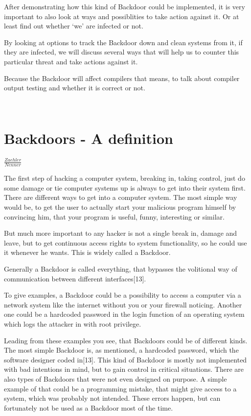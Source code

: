 \documentclass[a4paper, 12pt]{article}
\begin{document}
After demonstrating how this kind of Backdoor could be implemented, it is very important to also look at ways and possiblities to take action against it. Or at least find out whether `we' are infected or not.

By looking at options to track the Backdoor down and clean systems from it, if they are infected, we will discuss several ways that will help us to counter this particular threat and take actions against it.

Because the Backdoor will affect compilers that means, to talk about compiler output testing and whether it is correct or not. 

\newpage
 
\ 
\section{Backdoors - A definition}

$ \frac{Zaehler}{Nenner} $


\newpage
The first step of hacking a computer system, breaking in, taking control, just do some damage or tie computer systems up is always to get into their system first.
There are different ways to get into a computer system. The most simple way would be, to get the user to actually start your malicious program himself by convincing him, that your program is useful, funny, interesting or similar.

But much more important to any hacker is not a single break in, damage and leave, but to get continuous access rights to system functionality, so he could use it whenever he wants. This is widely called a Backdoor.

Generally a Backdoor is called everything, that bypasses the volitional way of communication between different interfaces[13].

To give examples, a Backdoor could be a possibility to access a computer via a network system like the internet without you or your firewall noticing. Another one could be a hardcoded password in the login function of an operating system which logs the attacker in with root privilege.

Leading from these examples you see, that Backdoors could be of different kinds. The most simple Backdoor is, as mentioned, a hardcoded password, which the software designer coded in[13]. This kind of Backdoor is mostly not implemented with bad intentions in mind, but to gain control in critical situations. There are also types of Backdoors that were not even designed on purpose. A simple example of that could be a programming mistake, that might give access to a system, which was probably not intended. These errors happen, but can fortunately not be used as a Backdoor most of the time.
\end{document}
